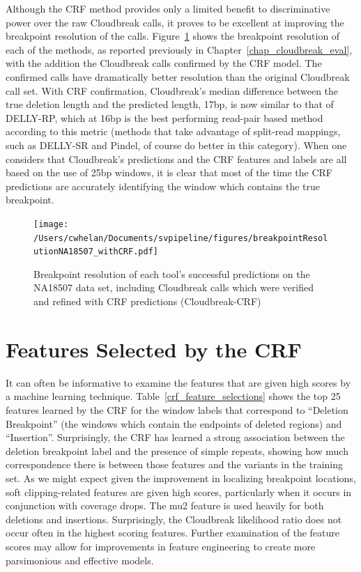 Although the CRF method provides only a limited benefit to discriminative power over the raw Cloudbreak calls, it proves to be excellent at improving the breakpoint resolution of the calls. Figure~\ref{breakpoint_resolution_NA18507_with_crf} shows the breakpoint resolution of each of the methods, as reported previously in Chapter~\ref{chap_cloudbreak_eval}, with the addition the Cloudbreak calls confirmed by the CRF model. The confirmed calls have dramatically better resolution than the original Cloudbreak call set. With CRF confirmation, Cloudbreak's median difference between the true deletion length and the predicted length, 17bp, is now similar to that of DELLY-RP, which at 16bp is the best performing read-pair based method according to this metric (methods that take advantage of split-read mappings, such as DELLY-SR and Pindel, of course do better in this category). When one considers that Cloudbreak's predictions and the CRF features and labels are all based on the use of 25bp windows, it is clear that most of the time the CRF predictions are accurately identifying the window which contains the true breakpoint.

\begin{figure}
\centering
\texttt{[image: /Users/cwhelan/Documents/svpipeline/figures/breakpointResolutionNA18507\_withCRF.pdf]}
\caption{Breakpoint resolution of each tool's successful predictions on the NA18507 data set, including Cloudbreak calls which were verified and refined with CRF predictions (Cloudbreak-CRF)}
\label{breakpoint_resolution_NA18507_with_crf}
\end{figure}

\section{Features Selected by the CRF}

It can often be informative to examine the features that are given high scores by a machine learning technique. Table~\ref{crf_feature_selections} shows the top 25 features learned by the CRF for the window labels that correspond to ``Deletion Breakpoint'' (the windows which contain the endpoints of deleted regions) and ``Insertion''. Surprisingly, the CRF has learned a strong association between the deletion breakpoint label and the presence of simple repeats, showing how much correspondence there is between those features and the variants in the training set. As we might expect given the improvement in localizing breakpoint locations, soft clipping-related features are given high scores, particularly when it occurs in conjunction with coverage drops. The mu2 feature is used heavily for both deletions and insertions. Surprisingly, the Cloudbreak likelihood ratio does not occur often in the highest scoring features. Further examination of the feature scores may allow for improvements in feature engineering to create more parsimonious and effective models.

